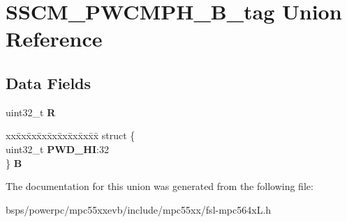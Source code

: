 \hypertarget{unionSSCM__PWCMPH__32B__tag}{}\section{S\+S\+C\+M\+\_\+\+P\+W\+C\+M\+P\+H\+\_\+B\+\_\+tag Union Reference}
\label{unionSSCM__PWCMPH__32B__tag}
\subsection*{Data Fields}
\begin{DoxyCompactItemize}
\item 
\mbox{\label{unionSSCM__PWCMPH__32B__tag_a3987a7676fa69982c40d0d5095340a6d}} 
uint32\+\_\+t {\bfseries R}
\item 
\mbox{\label{unionSSCM__PWCMPH__32B__tag_a3c09ef2f857eb0e0a5d92c23a3e3e4cc}} 
\begin{tabbing}
xx\=xx\=xx\=xx\=xx\=xx\=xx\=xx\=xx\=\kill
struct \{\\
\>uint32\_t {\bfseries PWD\_HI}:32\\
\} {\bfseries B}\\

\end{tabbing}\end{DoxyCompactItemize}


The documentation for this union was generated from the following file\+:\begin{DoxyCompactItemize}
\item 
bsps/powerpc/mpc55xxevb/include/mpc55xx/fsl-\/mpc564x\+L.\+h\end{DoxyCompactItemize}
